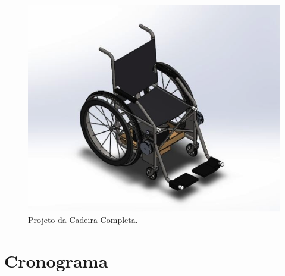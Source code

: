 \begin{figure}[!htb]
    \begin{center}
        \includegraphics{figuras/complete_chair.png}
    \end{center}
    \caption{Projeto da Cadeira Completa.}
    \label{fig:complete_chair}
\end{figure}

\section{Cronograma}

